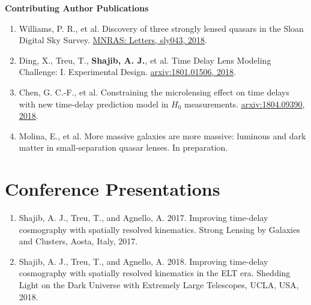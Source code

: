 \documentclass[margin,line]{res}
\begin{document}
\begin{resume}
\textbf{Contributing Author Publications} \\
\begin{enumerate}
	\item Williams, P. R., et al. Discovery of three strongly lensed quasars in the Sloan Digital Sky Survey. \href{https://doi.org/10.1093/mnrasl/sly043}{MNRAS: Letters, sly043, 2018}.
	\item Ding, X., Treu, T., {\bf Shajib, A. J.}, et al. Time Delay Lens Modeling Challenge: I. Experimental Design. \href{https://arxiv.org/abs/1801.01506}{arxiv:1801.01506, 2018}.
	\item Chen, G. C.-F., et al. Constraining the microlensing effect on time delays with new time-delay prediction model in $H_0$ measurements. \href{https://arxiv.org/abs/1804.09390}{arxiv:1804.09390, 2018}.

 
	\item Molina, E., et al. More massive galaxies are more massive: luminous and dark matter in small-separation quasar lenses. In preparation.
\end{enumerate}


\section{\sc Conference Presentations}
\begin{enumerate}
	\item Shajib, A. J., Treu, T., and Agnello, A. 2017. Improving time-delay cosmography with spatially resolved kinematics. Strong Lensing by Galaxies and Clusters, Aosta, Italy, 2017.
	\item Shajib, A. J., Treu, T., and Agnello, A. 2018. Improving time-delay cosmography with spatially resolved kinematics in the ELT era. Shedding Light on the Dark Universe with Extremely Large Telescopes, UCLA, USA, 2018.
\end{enumerate}
%


\end{resume}
\end{document}
